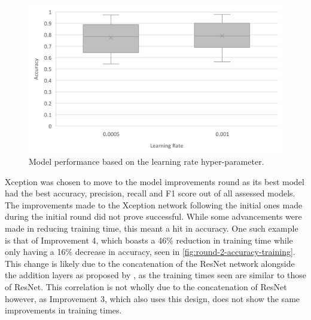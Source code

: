 \begin{figure}[H]
    \centering
    \includegraphics[width=\textwidth]{figures/round-1-learning-rate.png}
    \caption{Model performance based on the learning rate hyper-parameter.}
    \label{fig:round-1-learning-rate}
\end{figure}

Xception was chosen to move to the model improvements round as its best model had the best accuracy, precision, recall and F1 score out of all assessed models. The improvements made to the Xception network following the initial ones made during the initial round did not prove successful. While some advancements were made in reducing training time, this meant a hit in accuracy. One such example is that of Improvement 4, which boasts a 46\% reduction in training time while only having a 16\% decrease in accuracy, seen in \autoref{fig:round-2-accuracy-training}. This change is likely due to the concatenation of the ResNet network alongside the addition layers as proposed by \cite{fitriasari2021improvement}, as the training times seen are similar to those of ResNet. This correlation is not wholly due to the concatenation of ResNet however, as Improvement 3, which also uses this design, does not show the same improvements in training times.


